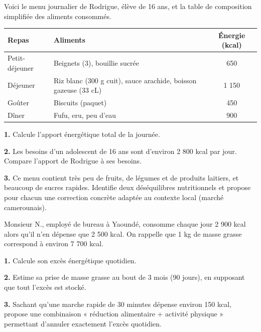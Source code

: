 \documentclass[11pt]{article}
\begin{document}
\begin{exercice}
Voici le menu journalier de Rodrigue, élève de 16 ans, et la table de composition simplifiée des aliments consommés.

\begin{center}
\begin{tabularx}{\linewidth}{|l|X|c|}
\hline
\rowcolor{popblueL} \textbf{Repas} & \textbf{Aliments} & \textbf{Énergie (kcal)} \\
\hline
Petit-déjeuner & Beignets (3), bouillie sucrée & 650 \\
\hline
Déjeuner & Riz blanc (300 g cuit), sauce arachide, boisson gazeuse (33 cL) & 1 150 \\
\hline
Goûter & Biscuits (paquet) & 450 \\
\hline
Dîner & Fufu, eru, peu d'eau & 900 \\
\hline
\end{tabularx}
\end{center}

\textbf{1.} Calcule l'apport énergétique total de la journée.

\textbf{2.} Les besoins d'un adolescent de 16 ans sont d'environ 2 800 kcal par jour. Compare l'apport de Rodrigue à ses besoins.

\textbf{3.} Ce menu contient très peu de fruits, de légumes et de produits laitiers, et beaucoup de sucres rapides. Identifie deux déséquilibres nutritionnels et propose pour chacun une correction concrète adaptée au contexte local (marché camerounais).
\end{exercice}

\begin{exercice}
Monsieur N., employé de bureau à Yaoundé, consomme chaque jour 2 900 kcal alors qu'il n'en dépense que 2 500 kcal. On rappelle que 1 kg de masse grasse correspond à environ 7 700 kcal.

\textbf{1.} Calcule son excès énergétique quotidien.

\textbf{2.} Estime sa prise de masse grasse au bout de 3 mois (90 jours), en supposant que tout l'excès est stocké.

\textbf{3.} Sachant qu'une marche rapide de 30 minutes dépense environ 150 kcal, propose une combinaison « réduction alimentaire + activité physique » permettant d'annuler exactement l'excès quotidien.
\end{exercice}
\end{document}
